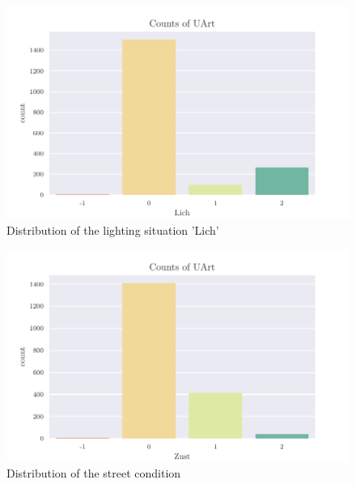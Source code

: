 \documentclass[a4paper,headsepline,footsepline,fontsize=11pt,BCOR=12mm,DIV=12]{report}
\begin{document}
\begin{appendices}
\begin{figure}[h]
	\centering
	\includegraphics[scale=1]{../CorrAnalysis/data/BAYSIS/02_matched/plots/baysis_matched_count_Lich}
	\caption{Distribution of the lighting situation 'Lich'}
	\label{img:appendix_baysis_matched_Lich}
\end{figure}

\begin{figure}[h]
	\centering
	\includegraphics[scale=1]{../CorrAnalysis/data/BAYSIS/02_matched/plots/baysis_matched_count_Zust}
	\caption{Distribution of the street condition}
	\label{img:appendix_baysis_matched_Zust 'Zust'}
\end{figure}


\end{appendices}
\end{document}
